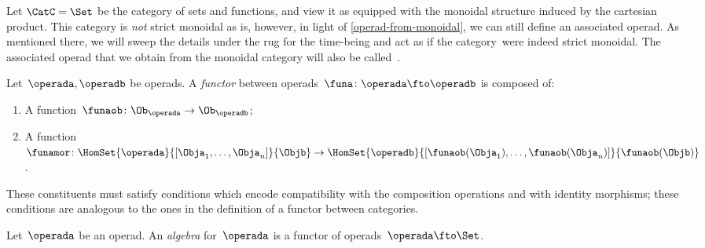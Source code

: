 \begin{example}
	Let $\CatC = \Set$ be the category of sets and functions, and view it as equipped with the monoidal structure induced by the cartesian product.
	This category is \emph{not} strict monoidal as is, however, in light of \cref{operad-from-monoidal}, we can still define an associated operad.
	As mentioned there, we will sweep the details under the rug for the time-being and act as if the category~\Set were indeed strict monoidal.
	The associated operad that we obtain from the monoidal category \Set will also be called~\Set.
\end{example}

\begin{ctdefinition}
	\label{def:functors_operads}
	Let~$\operada,\operadb$ be operads.
	A \emph{functor} between operads~$\funa\colon \operada \fto \operadb$  is composed of:
	\begin{enumerate}
		\item A function~$\funaob\colon \Ob_\operada\to \Ob_\operadb$;
		\item A function~$\funamor\colon \HomSet{\operada}{[\Obja_1,\ldots,\Obja_n]}{\Objb}\to \HomSet{\operadb}{[\funaob(\Obja_1),\ldots, \funaob(\Obja_n)]}{\funaob(\Objb)}$.
	\end{enumerate}
	These constituents must satisfy conditions which encode compatibility with the composition operations and with identity morphisms; these conditions are analogous to the ones in the definition of a functor between categories.
\end{ctdefinition}


\begin{definition}
	\label{def:algebra_operad}
	Let~$\operada$ be an operad.
	An \emph{algebra} for~$\operada$ is a functor of operads~$\operada \fto \Set$.
\end{definition}


